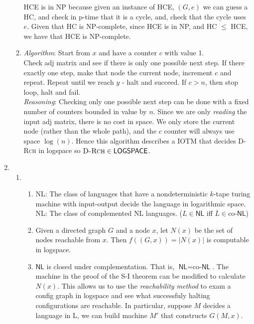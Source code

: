 \documentclass[a4paper, draft, 12pt]{article}
\begin{document}
\begin{enumerate}
\begin{enumerate}
  HCE is in \textsf{NP} because given an instance of HCE, $(G,e)$ we can guess 
  a HC, and check in p-time that it is a cycle, and, check
  that the cycle uses $e$. Given that HC is \textsf{NP}-complete, since HCE is in \textsf{NP}, and HC $\le$ HCE, 
  we have that \textsc{HCE} is \textsf{NP}-complete.
\item %
  \textit{Algorithm}:
  Start from $x$ and have a counter $c$ with value 1. \\
  Check adj matrix and see if there is only one possible next step. 
  If there exactly one step, make that node the current node, increment $c$ and repeat. 
  Repeat until we reach $y$ - halt and succeed. If $c > n$, then stop loop, halt and fail. \\
  \textit{Reasoning}:
  Checking only one possible next step can be done with 
  a fixed number of counters bounded in value by $n$. Since we are only 
  \textit{reading} the input adj matrix, there is no cost in space.
  We only store the current node (rather than the whole path), 
  and the $c$ counter will always use space $\log(n)$. Hence this algorithm 
  describes a IOTM that decides \textsc{D-Rch} in logspace so $\textsc{D-Rch} \in \textsf{LOGSPACE}$. 

\end{enumerate}

\item %
\begin{enumerate}
\item %
  \begin{enumerate}
  \item %
  \textsf{NL}: The class of languages that have a nondeterministic $k$-tape turing machine with input-output 
  decide the language in logarithmic space. \\
  \textsf{NL}: The class of complemented \textsf{NL} languages. 
  ($L \in \textsf{NL}$ iff $\overline{L} \in \text{co-}\textsf{NL}$)
  \item %
  Given a directed graph $G$ and a node $x$, let $N(x)$ be the set of nodes reachable 
  from $x$. Then $f((G,x)) = |N(x)|$ is computable in logspace. 
  \item %
  $\textsf{NL}$ is closed under complementation. That is, $\textsf{NL} = \text{co-}\textsf{NL}$.
  The machine in the proof of the S-I theorem can be modified to calculate $N(x)$. 
  This allows us to use the \textit{reachability method} to exam a config graph in logspace 
  and see what successfuly halting configurations are reachable. In particular, 
  suppose $M$ decides a language in \textsf{L}, we can build machine $M'$ that constructs $G(M,x)$.
  

\end{enumerate}
\end{enumerate}
\end{enumerate}
\end{document}

